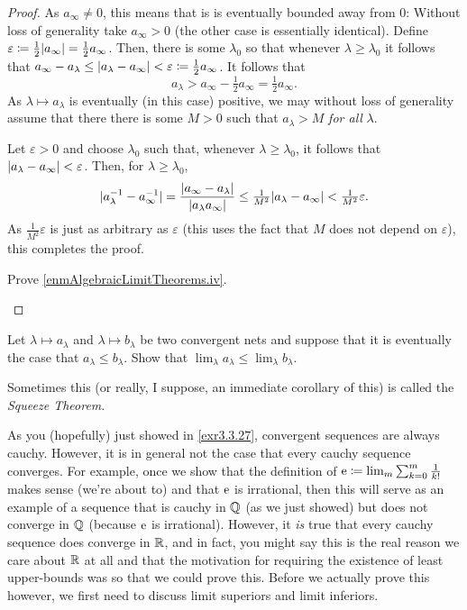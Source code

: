 \begin{prp}
\begin{proof}
As $a_\infty \neq 0$, this means that is is eventually bounded away from $0$:  Without loss of generality take $a_\infty >0$ (the other case is essentially identical).  Define $\varepsilon \coloneqq \frac{1}{2}\lvert a_\infty\rvert=\frac{1}{2}a_\infty$.  Then, there is some $\lambda _0$ so that whenever $\lambda \geq \lambda _0$ it follows that $a_\infty -a_\lambda \leq \lvert a_\lambda -a_\infty\rvert<\varepsilon \coloneqq \frac{1}{2}a_\infty$.  It follows that
\begin{equation}
a_\lambda >a_\infty -\tfrac{1}{2}a_\infty =\tfrac{1}{2}a_\infty.
\end{equation}
As $\lambda \mapsto a_\lambda$ is eventually (in this case) positive, we may without loss of generality assume that there there is some $M>0$ such that $a_\lambda >M$ \emph{for all} $\lambda$.

Let $\varepsilon >0$ and choose $\lambda _0$ such that, whenever $\lambda \geq \lambda _0$, it follows that $\lvert a_\lambda -a_\infty\rvert<\varepsilon$.  Then, for $\lambda \geq \lambda _0$,
\begin{equation}
\lvert a_\lambda ^{-1}-a_\infty ^{-1}\rvert=\frac{\lvert a_\infty -a_\lambda\rvert}{\lvert a_\lambda a_\infty\rvert}\leq \tfrac{1}{M^2}\lvert a_\lambda -a_\infty\rvert<\tfrac{1}{M^2}\varepsilon .
\end{equation}
As $\frac{1}{M^2}\varepsilon$ is just as arbitrary as $\varepsilon$ (this uses the fact that $M$ does not depend on $\varepsilon$), this completes the proof.
\begin{exr}
Prove \ref{enmAlgebraicLimitTheorems.iv}.
\end{exr}
\end{proof}
\end{prp}
\begin{exr}\label{exr3.3.30}
Let $\lambda \mapsto a_\lambda$ and $\lambda \mapsto b_\lambda$ be two convergent nets and suppose that it is eventually the case that $a_\lambda \leq b_\lambda$.  Show that $\lim _\lambda a_\lambda \leq \lim _\lambda b_\lambda$.
\begin{rmk}
Sometimes this (or really, I suppose, an immediate corollary of this) is called the \emph{Squeeze Theorem}.
\end{rmk}
\end{exr}

\horizontalrule

As you (hopefully) just showed in \cref{exr3.3.27}, convergent sequences are always cauchy.  However, it is in general not the case that every cauchy sequence converges.  For example, once we show that the definition of $\mathrm{e} \coloneqq \lim _m\sum _{k=0}^m\frac{1}{k!}$ makes sense (we're about to) and that $\mathrm{e}$ is irrational, then this will serve as an example of a sequence that is cauchy in $\mathbb{Q}$ (as we just showed) but does not converge in $\mathbb{Q}$ (because $\mathrm{e}$ is irrational).  However, it \emph{is} true that every cauchy sequence does converge in $\mathbb{R}$, and in fact, you might say this is the real reason we care about $\mathbb{R}$ at all and that the motivation for requiring the existence of least upper-bounds was so that we could prove this.  Before we actually prove this however, we first need to discuss limit superiors and limit inferiors.

